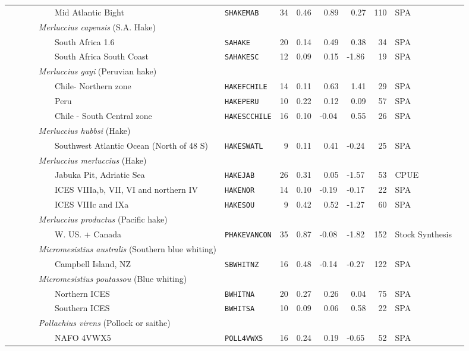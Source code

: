 \begin{flushleft}
\begin{tabular*}{7.1in}{llllllllll}
&~~~~~~~~~Mid Atlantic Bight&{\tt SHAKEMAB}&34&0.46&~0.89&~0.27&110&SPA  & \\ 
&{\it~~~~~Merluccius capensis} (S.A. Hake)&~&~&~&~&~&~&~  & \\ 
&~~~~~~~~~South Africa 1.6&{\tt SAHAKE}&20&0.14&~0.49&~0.38&~34&SPA  & \\ 
&~~~~~~~~~South Africa South Coast&{\tt SAHAKESC}&12&0.09&~0.15&-1.86&~19&SPA  & \\ 
&{\it~~~~~Merluccius gayi} (Peruvian hake)&~&~&~&~&~&~&~  & \\ 
&~~~~~~~~~Chile- Northern zone&{\tt HAKEFCHILE}&14&0.11&~0.63&~1.41&~29&SPA  & \\ 
&~~~~~~~~~Peru&{\tt HAKEPERU}&10&0.22&~0.12&~0.09&~57&SPA  & \\ 
&~~~~~~~~~Chile - South Central zone&{\tt HAKESCCHILE}&16&0.10&-0.04&~0.55&~26&SPA  & \\ 
&{\it~~~~~Merluccius hubbsi} (Hake)&~&~&~&~&~&~&~  & \\ 
&~~~~~~~~~Southwest Atlantic Ocean (North of 48 S)&{\tt HAKESWATL}&~9&0.11&~0.41&-0.24&~25&SPA  & \\ 
&{\it~~~~~Merluccius merluccius} (Hake)&~&~&~&~&~&~&~  & \\ 
&~~~~~~~~~Jabuka Pit, Adriatic Sea&{\tt HAKEJAB}&26&0.31&~0.05&-1.57&~53&CPUE  & \\ 
&~~~~~~~~~ICES VIIIa,b, VII, VI and northern IV&{\tt HAKENOR}&14&0.10&-0.19&-0.17&~22&SPA  & \\ 
&~~~~~~~~~ICES VIIIc and IXa&{\tt HAKESOU}&~9&0.42&~0.52&-1.27&~60&SPA  & \\ 
&{\it~~~~~Merluccius productus} (Pacific hake)&~&~&~&~&~&~&~  & \\ 
&~~~~~~~~~W. US. + Canada&{\tt PHAKEVANCON}&35&0.87&-0.08&-1.82&152&Stock Synthesis  & \\ 
&{\it~~~~~Micromesistius australis} (Southern blue whiting)&~&~&~&~&~&~&~  & \\ 
&~~~~~~~~~Campbell Island, NZ&{\tt SBWHITNZ}&16&0.48&-0.14&-0.27&122&SPA  & \\ 
&{\it~~~~~Micromesistius poutassou} (Blue whiting)&~&~&~&~&~&~&~  & \\ 
&~~~~~~~~~Northern ICES&{\tt BWHITNA}&20&0.27&~0.26&~0.04&~75&SPA  & \\ 
&~~~~~~~~~Southern ICES&{\tt BWHITSA}&10&0.09&~0.06&~0.58&~22&SPA  & \\ 
&{\it~~~~~Pollachius virens} (Pollock or saithe)&~&~&~&~&~&~&~  & \\ 
&~~~~~~~~~NAFO 4VWX5&{\tt POLL4VWX5}&16&0.24&~0.19&-0.65&~52&SPA  & \\ 

\end{tabular*}
\end{flushleft}
